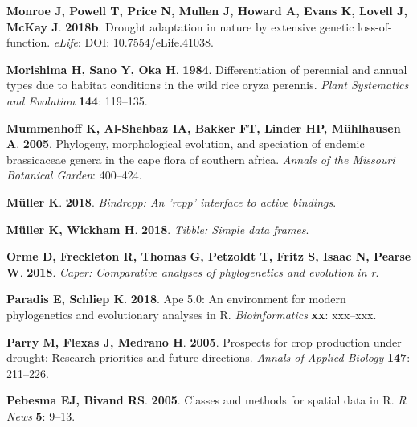 \documentclass[man,floatsintext]{apa6}
\theoremstyle{definition}
\theoremstyle{definition}
\theoremstyle{definition}
\theoremstyle{remark}
\begin{document}
\leavevmode\hypertarget{ref-monroe2018drought}{}%
\textbf{\textnormal{Monroe J}, \textnormal{Powell T}, \textnormal{Price
N}, \textnormal{Mullen J}, \textnormal{Howard A}, \textnormal{Evans K},
\textnormal{Lovell J}, \textnormal{McKay J}}. \textbf{2018b}. Drought
adaptation in nature by extensive genetic loss-of-function.
\emph{eLife}: DOI: 10.7554/eLife.41038.

\leavevmode\hypertarget{ref-morishima1984differentiation}{}%
\textbf{\textnormal{Morishima H}, \textnormal{Sano Y}, \textnormal{Oka
H}}. \textbf{1984}. Differentiation of perennial and annual types due to
habitat conditions in the wild rice oryza perennis. \emph{Plant
Systematics and Evolution} \textbf{144}: 119--135.

\leavevmode\hypertarget{ref-mummenhoff2005phylogeny}{}%
\textbf{\textnormal{Mummenhoff K}, \textnormal{Al-Shehbaz IA},
\textnormal{Bakker FT}, \textnormal{Linder HP}, \textnormal{Mühlhausen
A}}. \textbf{2005}. Phylogeny, morphological evolution, and speciation
of endemic brassicaceae genera in the cape flora of southern africa.
\emph{Annals of the Missouri Botanical Garden}: 400--424.

\leavevmode\hypertarget{ref-R-bindrcpp}{}%
\textbf{\textnormal{Müller K}}. \textbf{2018}. \emph{Bindrcpp: An 'rcpp'
interface to active bindings}.

\leavevmode\hypertarget{ref-R-tibble}{}%
\textbf{\textnormal{Müller K}, \textnormal{Wickham H}}. \textbf{2018}.
\emph{Tibble: Simple data frames}.

\leavevmode\hypertarget{ref-R-caper}{}%
\textbf{\textnormal{Orme D}, \textnormal{Freckleton R},
\textnormal{Thomas G}, \textnormal{Petzoldt T}, \textnormal{Fritz S},
\textnormal{Isaac N}, \textnormal{Pearse W}}. \textbf{2018}.
\emph{Caper: Comparative analyses of phylogenetics and evolution in r}.

\leavevmode\hypertarget{ref-R-ape}{}%
\textbf{\textnormal{Paradis E}, \textnormal{Schliep K}}. \textbf{2018}.
Ape 5.0: An environment for modern phylogenetics and evolutionary
analyses in R. \emph{Bioinformatics} \textbf{xx}: xxx--xxx.

\leavevmode\hypertarget{ref-parry2005prospects}{}%
\textbf{\textnormal{Parry M}, \textnormal{Flexas J}, \textnormal{Medrano
H}}. \textbf{2005}. Prospects for crop production under drought:
Research priorities and future directions. \emph{Annals of Applied
Biology} \textbf{147}: 211--226.

\leavevmode\hypertarget{ref-R-sp}{}%
\textbf{\textnormal{Pebesma EJ}, \textnormal{Bivand RS}}. \textbf{2005}.
Classes and methods for spatial data in R. \emph{R News} \textbf{5}:
9--13.
\end{document}
